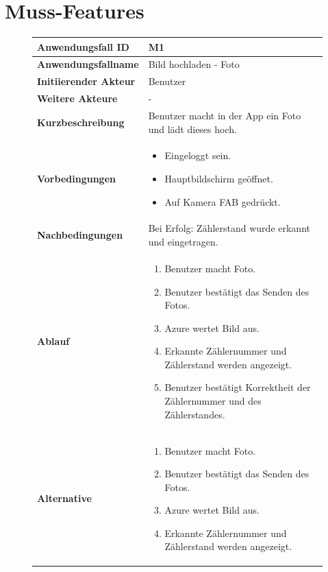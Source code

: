 \begin{figure}[H]
\end{figure}


\section{Muss-Features}
\begin{figure}[H]
	\centering
	\begin{tabularx}{\textwidth}{ X | X }
		\textbf{Anwendungsfall ID} & M1 \\ \hline
		\textbf{Anwendungsfallname} & Bild hochladen  - Foto \\ \hline
		\textbf{Initiierender Akteur} & Benutzer \\ \hline
		\textbf{Weitere Akteure} & - \\ \hline
		\textbf{Kurzbeschreibung} & Benutzer macht in der App ein Foto und lädt dieses hoch.   \\ \hline
		\textbf{Vorbedingungen} & 
		\begin {itemize}
			\item Eingeloggt sein. 
			\item Hauptbildschirm geöffnet.
			\item Auf Kamera FAB gedrückt.
		\end{itemize} \\ \hline
		\textbf{Nachbedingungen} & Bei Erfolg: Zählerstand wurde erkannt und eingetragen. \\ \hline
		\textbf{Ablauf} &
		\begin{enumerate}
			\item Benutzer macht Foto.
			\item Benutzer bestätigt das Senden des Fotos.
			\item Azure wertet Bild aus.
			\item Erkannte Zählernummer und Zählerstand werden angezeigt.
			\item Benutzer bestätigt Korrektheit der Zählernummer und des Zählerstandes.
		\end{enumerate} \\ \hline
		\textbf{Alternative} &
		\begin{enumerate}
			\item Benutzer macht Foto.
			\item Benutzer bestätigt das Senden des Fotos.
			\item Azure wertet Bild aus.
			\item Erkannte Zählernummer und Zählerstand werden angezeigt.

\end{enumerate}
\end{tabularx}
\end{figure}
